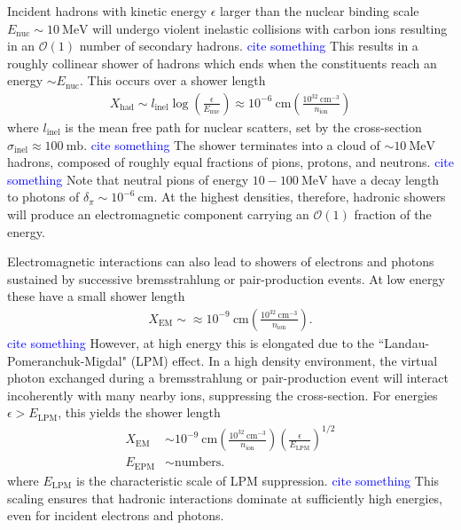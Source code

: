\documentclass[twocolumn, preprintnumbers,amsmath,amssymb,prd, superscriptaddress]{revtex4}
\newcommand{\OO}{\mathcal{O}}
\newcommand{\MeV}{\text{MeV}}
\def\r{\right)}
\def\l{\left(}
\begin{document}
Incident hadrons with kinetic energy $\epsilon$ larger than the nuclear binding scale $E_\text{nuc} \sim 10~\MeV$ will undergo violent inelastic collisions with carbon ions resulting in an $\OO(1)$ number of secondary hadrons. \textcolor{blue}{cite something}
This results in a roughly collinear shower of hadrons which ends when the constituents reach an energy $\sim E_\text{nuc}$.
This occurs over a shower length 
\begin{align}
\label{eq:hadlength}
  X_\text{had} \sim l_\text{inel} \log\l\frac{\epsilon}{E_\text{nuc}}\r
  \approx 10^{-6} ~\text{cm} \l\frac{10^{32}~\text{cm}^{-3}}{n_\text{ion}}\r
\end{align}
where $l_\text{inel}$ is the mean free path for nuclear scatters, set by the cross-section $\sigma_\text{inel} \approx 100 ~\text{mb}$. \textcolor{blue}{cite something}
The shower terminates into a cloud of $\sim 10~\MeV$ hadrons, composed of roughly equal fractions of pions, protons, and neutrons. \textcolor{blue}{cite something}
Note that neutral pions of energy $10 - 100 ~\text{MeV}$ have a decay length to photons of $\delta_\pi \sim 10^{-6} ~\text{cm}$.
At the highest densities, therefore, hadronic showers will produce an electromagnetic component carrying an $\OO(1)$ fraction of the energy.

Electromagnetic interactions can also lead to showers of electrons and photons sustained by successive bremsstrahlung or pair-production events. 
At low energy these have a small shower length 
\begin{align}
\label{eq:emlength}
  X_\text{EM} \sim \approx 10^{-9} ~\text{cm} 
  \l\frac{10^{32}~\text{cm}^{-3}}{n_\text{ion}}\r.
\end{align}
\textcolor{blue}{cite something}
However, at high energy this is elongated due to the ``Landau-Pomeranchuk-Migdal" (LPM) effect. 
In a high density environment, the virtual photon exchanged during a bremsstrahlung or pair-production event will interact incoherently with many nearby ions, suppressing the cross-section.  
For energies $\epsilon > E_\text{LPM}$, this yields the shower length
\begin{align}
  X_\text{EM} &\sim 10^{-9} ~\text{cm} 
  \l\frac{10^{32}~\text{cm}^{-3}}{n_\text{ion}}\r 
  \l \frac{\epsilon}{E_\text{LPM}} \r^{1/2} \\
 E_\text{EPM} &\sim \text{numbers}.
\end{align}
where $E_\text{LPM}$ is the characteristic scale of LPM suppression.
\textcolor{blue}{cite something}
This scaling ensures that hadronic interactions dominate at sufficiently high energies, even for incident electrons and photons. 
\end{document}
